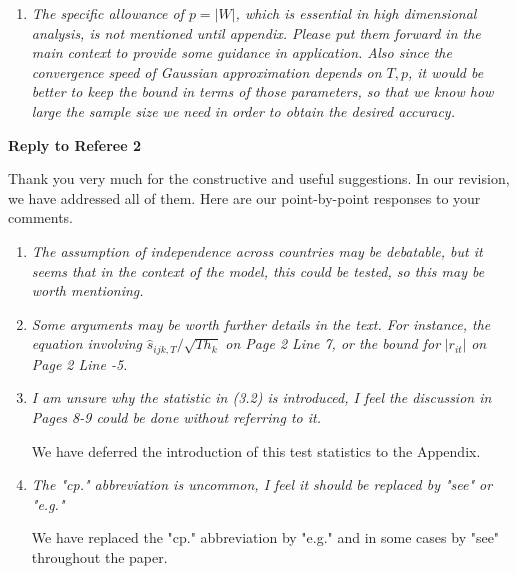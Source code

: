 \documentclass[a4paper,12pt]{article}
\begin{document}
\begin{enumerate}[label=(\arabic*),leftmargin=0.7cm]
\begin{enumerate}[label=(\roman*)]
It can indeed be proven that our multiscale test has asymptotic power $1$ against local alternatives. We have added this result as Corollary A.2 in the Appendix to the paper. The proof is provided in the Supplementary Material.

\item \textit{The argument about no need for time dependent data is reasonable, just a short comment: there already exists result extending Chernozukov et al's GA to time dependent case, maybe this paper can be further extended to time dependent data as well.}
\end{enumerate}

\item \textit{The specific allowance of $p = |W|$, which is essential in high dimensional analysis, is not mentioned until appendix. Please put them forward in the main context to provide some guidance in application. Also since the convergence speed of Gaussian approximation depends on $T, p$, it would be better to keep the bound in terms of those parameters, so that we know how large the sample size we need in order to obtain the desired accuracy.}

\end{enumerate}



\newpage
\begin{center}
{\large \bf Reply to Referee 2} 
\end{center}


Thank you very much for the constructive and useful suggestions. In our revision, we have addressed all of them. Here are our point-by-point responses to your comments. 


\begin{enumerate}[label=(\arabic*),leftmargin=0.7cm]

\item \textit{The assumption of independence across countries may be debatable, but it seems that in the context of the model, this could be tested, so this may be worth mentioning.}

\item \textit{Some arguments may be worth further details in the text. For instance, the equation involving} $\widehat{s}_{ijk,T} / \sqrt{T h_k}$ \textit{on Page 2 Line 7, or the bound for} $|r_{it}|$ \textit{on Page 2 Line -5.}

\item \textit{I am unsure why the statistic in (3.2) is introduced, I feel the discussion in Pages 8-9 could be done without referring to it.}

We have deferred the introduction of this test statistics to the Appendix.

\item \textit{The "cp." abbreviation is uncommon, I feel it should be replaced by "see" or "e.g."}

We have replaced the "cp." abbreviation by "e.g." and in some cases by "see" throughout the paper.
 

\end{enumerate}



\newpage

{\small
\setlength{\bibsep}{0.45em}
}
\end{document}
